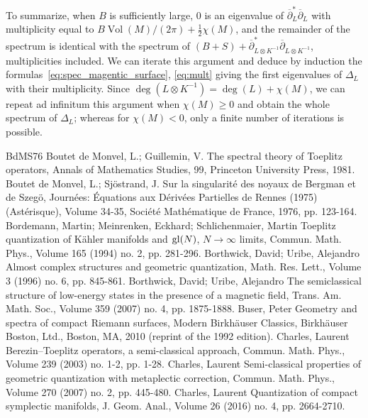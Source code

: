 \documentclass[10pt,a4paper]{article}
\theoremstyle{definition}
\numberwithin{equation}{section}
\newcommand{\con}{\overline}
\newcommand{\op}{\operatorname}
\begin{document}
To summarize, when $B$ is sufficiently large, $0 $ is an eigenvalue of $\con{\partial}^*_L \con{\partial}_L$ with multiplicity equal to $ B
\op{Vol}(M) / (2 \pi) + \frac{1}{2} \chi(M)$, and the remainder of the spectrum is identical with the spectrum of $(B+S) + \con{\partial}^*_{L\otimes K^{-1}}
\con{\partial}_{L\otimes K^{-1}}$, multiplicities included. We can iterate this argument and deduce by induction the formulas~\eqref{eq:spec_magentic_surface}, \eqref{eq:mult} giving the first eigenvalues of $\Delta_{L}$ with their multiplicity. Since $\op{deg} (L \otimes K^{-1}) = \op{deg} (L) + \chi (M)$, we can repeat ad infinitum this argument when $\chi (M) \geqslant 0$ and obtain the whole spectrum of $\Delta_L$; whereas for $\chi (M) <0$, only a finite number of iterations is possible.

\begin{thebibliography}{BdMS76}
 Boutet de Monvel, L.; Guillemin, V. The spectral theory of Toeplitz operators, Annals of Mathematics Studies, 99, Princeton University Press, 1981.
 Boutet de Monvel, L.; Sjöstrand, J. Sur la singularité des noyaux de Bergman et de Szegö, Journées: Équations aux Dérivées Partielles de Rennes (1975) (Astérisque), Volume 34-35, Société Mathématique de France, 1976, pp. 123-164.
 Bordemann, Martin; Meinrenken, Eckhard; Schlichenmaier, Martin Toeplitz quantization of Kähler manifolds and ${\rm gl}({N})$, ${N}\rightarrow \infty $ limits, Commun. Math. Phys., Volume 165 (1994) no. 2, pp. 281-296.
 Borthwick, David; Uribe, Alejandro Almost complex structures and geometric quantization, Math. Res. Lett., Volume 3 (1996) no. 6, pp. 845-861.
 Borthwick, David; Uribe, Alejandro The semiclassical structure of low-energy states in the presence of a magnetic field, Trans. Am. Math. Soc., Volume 359 (2007) no. 4, pp. 1875-1888.
 Buser, Peter Geometry and spectra of compact Riemann surfaces, Modern Birkhäuser Classics, Birkhäuser Boston, Ltd., Boston, MA, 2010 (reprint of the 1992 edition).
 Charles, Laurent Berezin–Toeplitz operators, a semi-classical approach, Commun. Math. Phys., Volume 239 (2003) no. 1-2, pp. 1-28.
 Charles, Laurent Semi-classical properties of geometric quantization with metaplectic correction, Commun. Math. Phys., Volume 270 (2007) no. 2, pp. 445-480.
 Charles, Laurent Quantization of compact symplectic manifolds, J. Geom. Anal., Volume 26 (2016) no. 4, pp. 2664-2710.

\end{thebibliography}
\end{document}
